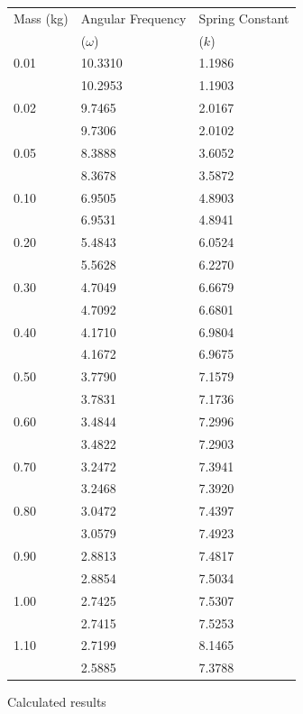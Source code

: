 \documentclass{article}
\numberwithin{figure}{section}
\numberwithin{table}{section}
\begin{document}
\FloatBarrier

\begin{figure}[!hbp] 
    \centering
    \begin{tabular}{lll} 
            \toprule
            Mass (kg) & Angular Frequency & Spring Constant \\
                        & ($\omega$) & ($k$) \\ 
            \midrule 
            0.01 & 10.3310 & 1.1986 \\ 
            & 10.2953 & 1.1903 \\
            0.02 & 9.7465 & 2.0167 \\ 
            & 9.7306 & 2.0102 \\
            0.05 & 8.3888 & 3.6052 \\ 
            & 8.3678 & 3.5872 \\
            0.10 & 6.9505 & 4.8903 \\ 
            & 6.9531 & 4.8941 \\
            0.20 & 5.4843 & 6.0524 \\ 
            & 5.5628 & 6.2270 \\
            0.30 & 4.7049 & 6.6679 \\ 
            & 4.7092 & 6.6801 \\
            0.40 & 4.1710 & 6.9804 \\ 
            & 4.1672 & 6.9675 \\
            0.50 & 3.7790 & 7.1579 \\ 
            & 3.7831 & 7.1736 \\
            0.60 & 3.4844 & 7.2996 \\ 
            & 3.4822 & 7.2903 \\
            0.70 & 3.2472 & 7.3941 \\ 
            & 3.2468 & 7.3920 \\
            0.80 & 3.0472 & 7.4397 \\ 
            & 3.0579 & 7.4923 \\
            0.90 & 2.8813 & 7.4817 \\ 
            & 2.8854 & 7.5034 \\
            1.00 & 2.7425 & 7.5307 \\ 
            & 2.7415 & 7.5253 \\
            1.10 & 2.7199 & 8.1465 \\ 
            & 2.5885 & 7.3788 \\
            \bottomrule
    \end{tabular} 
    \caption{Calculated results} 
    \label{results} 
\end{figure}
\end{document}
